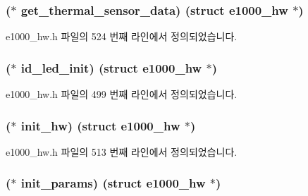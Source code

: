 \subsubsection[{\texorpdfstring{get\+\_\+thermal\+\_\+sensor\+\_\+data}{get_thermal_sensor_data}}]{($\ast$ get\+\_\+thermal\+\_\+sensor\+\_\+data) (struct {\bf e1000\+\_\+hw} $\ast$)}\hypertarget{structe1000__mac__operations_a4bf4917f47d329084d4cb00f2c67ef5e}{}\label{structe1000__mac__operations_a4bf4917f47d329084d4cb00f2c67ef5e}


e1000\+\_\+hw.\+h 파일의 524 번째 라인에서 정의되었습니다.

\subsubsection[{\texorpdfstring{id\+\_\+led\+\_\+init}{id_led_init}}]{($\ast$ id\+\_\+led\+\_\+init) (struct {\bf e1000\+\_\+hw} $\ast$)}\hypertarget{structe1000__mac__operations_a067c24ad963badca2ab8fdbdcca1a8ca}{}\label{structe1000__mac__operations_a067c24ad963badca2ab8fdbdcca1a8ca}


e1000\+\_\+hw.\+h 파일의 499 번째 라인에서 정의되었습니다.

\subsubsection[{\texorpdfstring{init\+\_\+hw}{init_hw}}]{($\ast$ init\+\_\+hw) (struct {\bf e1000\+\_\+hw} $\ast$)}\hypertarget{structe1000__mac__operations_a942dab527d844af2505d62b9a98c9f36}{}\label{structe1000__mac__operations_a942dab527d844af2505d62b9a98c9f36}


e1000\+\_\+hw.\+h 파일의 513 번째 라인에서 정의되었습니다.

\subsubsection[{\texorpdfstring{init\+\_\+params}{init_params}}]{($\ast$ init\+\_\+params) (struct {\bf e1000\+\_\+hw} $\ast$)}\hypertarget{structe1000__mac__operations_a9697a81cd453237323e05ff88409b12e}{}\label{structe1000__mac__operations_a9697a81cd453237323e05ff88409b12e}


